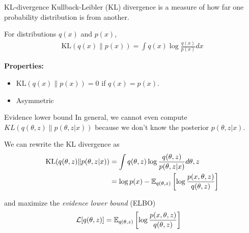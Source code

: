 \documentclass[10pt, compress]{beamer}
\begin{document}
\begin{frame}{KL-divergence}
  Kullback-Leibler (KL) divergence
  is a measure of how far one probability distribution
  is from another.

  \pause
  For distributions $q(x)$ and $p(x)$,
  \begin{align*}
    \textrm{KL}(q(x)\|p(x)) = \int q(x)\log \frac{q(x)}{p(x)}dx
  \end{align*}

  \pause
  \textbf{Properties:}
  \begin{itemize}
    \item $\textrm{KL}(q(x)\|p(x)) = 0$ if $q(x) = p(x)$.
    \item Asymmetric
  \end{itemize}

\end{frame}

\begin{frame}{Evidence lower bound}
  In general, we cannot even compute $KL(q(\theta, z)\|p(\theta, z | x))$
  because
  we don't know the posterior $p(\theta, z | x)$.

  \pause
  We can rewrite the KL divergence as
  \begin{align*}
    \textrm{KL}(q(\theta, z)\|p(\theta, z|x)) &= \int q(\theta, z)\log\frac{q(\theta, z)}{p(\theta, z | x)}d\theta, z \\
              &= \log p(x) - \mathbb{E}_{q(\theta, z)}\left[\log\frac{p(x, \theta, z)}{q(\theta, z)}\right]
  \end{align*}

  \pause
  and maximize the \emph{evidence lower bound} (ELBO)
  \begin{align*}
    \mathcal{L}[q(\theta, z)] &= \mathbb{E}_{q(\theta, z)}\left[\log\frac{p(x, \theta, z)}{q(\theta, z)}\right]
  \end{align*}
\end{frame}
\end{document}
